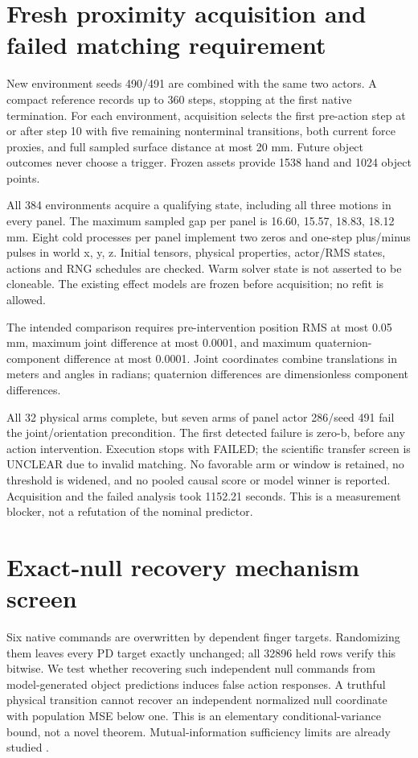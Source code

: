 \documentclass[10pt]{article}
\begin{document}
\section{Fresh proximity acquisition and failed matching requirement}
New environment seeds 490/491 are combined with the same two actors. A compact
reference records up to 360 steps, stopping at the first native termination.
For each environment, acquisition selects the first pre-action step at or after
step 10 with five remaining nonterminal transitions, both current force proxies,
and full sampled surface distance at most 20 mm. Future object outcomes never
choose a trigger. Frozen assets provide 1538 hand and 1024 object points.

All 384 environments acquire a qualifying state, including all three motions in
every panel. The maximum sampled gap per panel is 16.60, 15.57, 18.83, 18.12 mm.
Eight cold processes per panel implement two zeros and one-step plus/minus pulses
in world x, y, z. Initial tensors, physical properties, actor/RMS states, actions and
RNG schedules are checked. Warm solver state is not asserted to be cloneable.
The existing effect models are frozen before acquisition; no refit is allowed.

The intended comparison requires pre-intervention position RMS at most 0.05 mm,
maximum joint difference at most 0.0001, and maximum quaternion-component difference
at most 0.0001. Joint coordinates combine translations in meters and angles in
radians; quaternion differences are dimensionless component differences.

\begin{table}[h]
\centering

\caption{Maximum pre-intervention mismatch over arms relative to zero-a. Limits: position 0.05 mm; joint and quaternion components 0.0001.}
\end{table}

All 32 physical arms complete, but seven arms of panel actor 286/seed 491 fail the
joint/orientation precondition. The first detected failure is zero-b, before any
action intervention. Execution stops with FAILED; the scientific transfer screen
is UNCLEAR due to invalid matching. No favorable arm or window is retained, no
threshold is widened, and no pooled causal score or model winner is reported.
Acquisition and the failed analysis took 1152.21 seconds. This is a measurement
blocker, not a refutation of the nominal predictor.

\section{Exact-null recovery mechanism screen}
Six native commands are overwritten by dependent finger targets. Randomizing them
leaves every PD target exactly unchanged; all 32896 held rows verify this bitwise.
We test whether recovering such independent null commands from model-generated
object predictions induces false action responses. A truthful physical transition
cannot recover an independent normalized null coordinate with population MSE below
one. This is an elementary conditional-variance bound, not a novel theorem.
Mutual-information sufficiency limits are already studied \cite{rakelly2021}.
\end{document}
